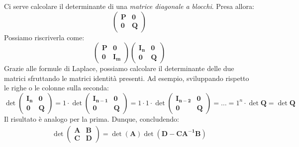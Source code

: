 \begin{demonstration}
\begin{equation*}
	\end{equation*}
Ci serve calcolare il determinante di una \textit{matrice diagonale a blocchi}. Presa allora:
\begin{equation*}
	\left(
	\begin{array}{c|c}
		\mathbf{P} & \mathbf{0}\\
		\hline
		\mathbf{0} & \mathbf{Q}
	\end{array}
	\right)
\end{equation*}
Possiamo riscriverla come:
\begin{equation*}
	\left(
	\begin{array}{c|c}
		\mathbf{P} & \mathbf{0}\\
		\hline
		\mathbf{0} & \mathbf{I_m}
	\end{array}
	\right)\left(
	\begin{array}{c|c}
		\mathbf{I_n} & \mathbf{0}\\
		\hline
		\mathbf{0} & \mathbf{Q}
	\end{array}
	\right)
\end{equation*}
Grazie alle formule di Laplace, possiamo calcolare il determinante delle due matrici sfruttando le matrici identità presenti. Ad esempio, sviluppando rispetto le righe o le colonne sulla seconda:
\begin{equation*}
\det\left(
\begin{array}{c|c}
	\mathbf{I_n} & \mathbf{0}\\
	\hline
	\mathbf{0} & \mathbf{Q}
\end{array}
\right)=1\cdot \det\left(
\begin{array}{c|c}
	\mathbf{I_{n-1}} & \mathbf{0}\\
	\hline
	\mathbf{0} & \mathbf{Q}
\end{array}
\right)=1\cdot 1\cdot \det\left(
\begin{array}{c|c}
	\mathbf{I_{n-2}} & \mathbf{0}\\
	\hline
	\mathbf{0} & \mathbf{Q}
\end{array}
\right)=\ldots = 1^n\cdot \det \mathbf{Q} =\det \mathbf{Q}
\end{equation*}
Il risultato è analogo per la prima. Dunque, concludendo:
\begin{gather}
\det\left(
\begin{array}{c|c}
	\mathbf{A} & \mathbf{B}\\
	\hline
	\mathbf{C} & \mathbf{D}
\end{array}
\right)=\det\left(\mathbf{A}\right)\det\left(\mathbf{D-CA^{-1}B}\right)\\

\end{gather}
\end{demonstration}
